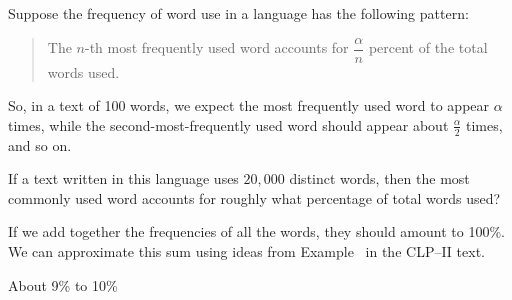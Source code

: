 


\begin{question}\label{probs3.2_Zipf1}
	Suppose the frequency of word use in a language has the following pattern:
	\begin{quote} \color{blue}The $n$-th most frequently used word accounts for $\dfrac{\alpha}{n}$ percent of the total words used.
	\end{quote} So, in a text of 100 words, we expect the most frequently used word to appear $\alpha$ times, while the second-most-frequently used word should appear about $\frac{\alpha}{2}$ times, and so on.

	If a text written in this language uses $20,000$ distinct words, then the most commonly used word accounts for roughly what percentage of total words used?

\end{question}
\begin{hint}
	If we add together the frequencies of all the words, they should amount to 100\%. We can approximate this sum using ideas from Example~ in the CLP--II text.
\end{hint}
\begin{answer}
	About 9\% to 10\%
\end{answer}
